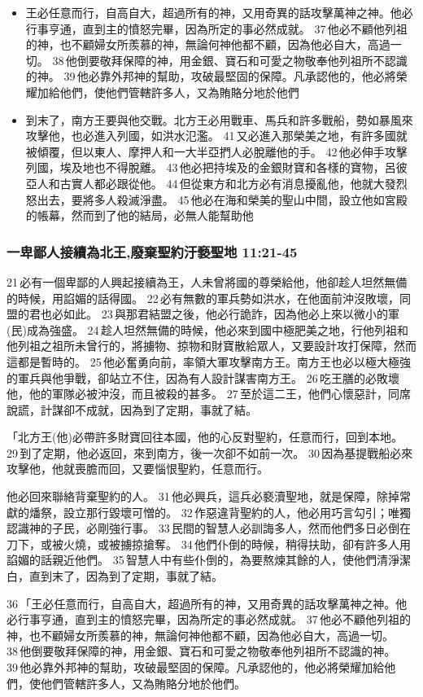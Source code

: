 \begin{itemize}
\item 王必任意而行，自高自大，超過所有的神，又用奇異的話攻擊萬神之神。他必行事亨通，直到主的憤怒完畢，因為所定的事必然成就。 37 他必不顧他列祖的神，也不顧婦女所羨慕的神，無論何神他都不顧，因為他必自大，高過一切。 38 他倒要敬拜保障的神，用金銀、寶石和可愛之物敬奉他列祖所不認識的神。 39 他必靠外邦神的幫助，攻破最堅固的保障。凡承認他的，他必將榮耀加給他們，使他們管轄許多人，又為賄賂分地於他們
\item 到末了，南方王要與他交戰。北方王必用戰車、馬兵和許多戰船，勢如暴風來攻擊他，也必進入列國，如洪水氾濫。 41 又必進入那榮美之地，有許多國就被傾覆，但以東人、摩押人和一大半亞捫人必脫離他的手。 42 他必伸手攻擊列國，埃及地也不得脫離。 43 他必把持埃及的金銀財寶和各樣的寶物，呂彼亞人和古實人都必跟從他。 44 但從東方和北方必有消息擾亂他，他就大發烈怒出去，要將多人殺滅淨盡。 45 他必在海和榮美的聖山中間，設立他如宮殿的帳幕，然而到了他的結局，必無人能幫助他
\end{itemize}
\fi

\subsubsection{一卑鄙人接續為北王,廢棄聖約汙褻聖地 11:21-45}
21 必有一個卑鄙的人興起接續為王，人未曾將國的尊榮給他，他卻趁人坦然無備的時候，用諂媚的話得國。 22 必有無數的軍兵勢如洪水，在他面前沖沒敗壞，同盟的君也必如此。 23 與那君結盟之後，他必行詭詐，因為他必上來以微小的軍(民)成為強盛。 24 趁人坦然無備的時候，他必來到國中極肥美之地，行他列祖和他列祖之祖所未曾行的，將擄物、掠物和財寶散給眾人，又要設計攻打保障，然而這都是暫時的。 25 他必奮勇向前，率領大軍攻擊南方王。南方王也必以極大極強的軍兵與他爭戰，卻站立不住，因為有人設計謀害南方王。 26 吃王膳的必敗壞他，他的軍隊必被沖沒，而且被殺的甚多。 27 至於這二王，他們心懷惡計，同席說謊，計謀卻不成就，因為到了定期，事就了結。

「北方王(他)必帶許多財寶回往本國，他的心反對聖約，任意而行，回到本地。 29 到了定期，他必返回，來到南方，後一次卻不如前一次。 30 因為基提戰船必來攻擊他，他就喪膽而回，又要惱恨聖約，任意而行。

他必回來聯絡背棄聖約的人。 31 他必興兵，這兵必褻瀆聖地，就是保障，除掉常獻的燔祭，設立那行毀壞可憎的。 32 作惡違背聖約的人，他必用巧言勾引；唯獨認識神的子民，必剛強行事。 33 民間的智慧人必訓誨多人，然而他們多日必倒在刀下，或被火燒，或被擄掠搶奪。 34 他們仆倒的時候，稍得扶助，卻有許多人用諂媚的話親近他們。 35 智慧人中有些仆倒的，為要熬煉其餘的人，使他們清淨潔白，直到末了，因為到了定期，事就了結。

36 「王必任意而行，自高自大，超過所有的神，又用奇異的話攻擊萬神之神。他必行事亨通，直到主的憤怒完畢，因為所定的事必然成就。 37 他必不顧他列祖的神，也不顧婦女所羨慕的神，無論何神他都不顧，因為他必自大，高過一切。 38 他倒要敬拜保障的神，用金銀、寶石和可愛之物敬奉他列祖所不認識的神。 39 他必靠外邦神的幫助，攻破最堅固的保障。凡承認他的，他必將榮耀加給他們，使他們管轄許多人，又為賄賂分地於他們。

